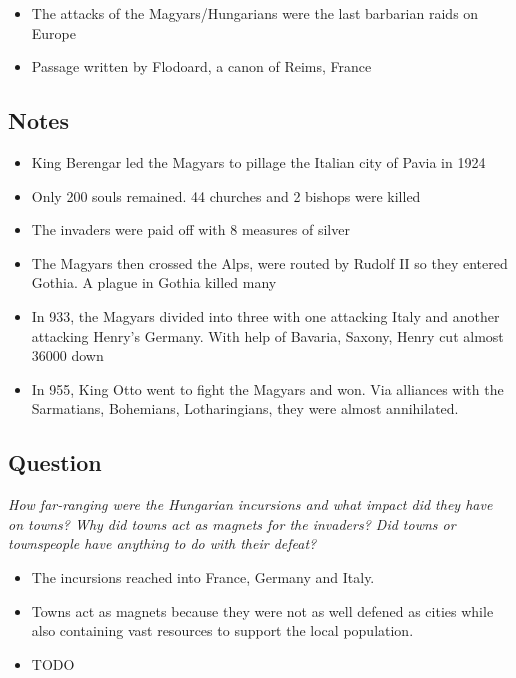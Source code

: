 \documentclass[12pt]{article}
\begin{document}
\begin{itemize}
	\item The attacks of the Magyars/Hungarians were the last barbarian raids on Europe
	\item Passage written by Flodoard, a canon of Reims, France
\end{itemize}

\subsection*{Notes}

\begin{itemize}
	\item King Berengar led the Magyars to pillage the Italian city of Pavia in 1924
	\item Only 200 souls remained. 44 churches and 2 bishops were killed
	\item The invaders were paid off with 8 measures of silver
	\item The Magyars then crossed the Alps, were routed by Rudolf II so they entered Gothia. A plague in Gothia killed many
	\item In 933, the Magyars divided into three with one attacking Italy and another attacking Henry's Germany. With help of Bavaria, Saxony, Henry cut almost 36000 down
	\item In 955, King Otto went to fight the Magyars and won. Via alliances with the Sarmatians, Bohemians, Lotharingians, they were almost annihilated.
\end{itemize}

\subsection*{Question}

\textit{How far-ranging were the Hungarian incursions and what impact did they have on towns? Why did towns act as magnets for the invaders? Did towns or townspeople have anything to do with their defeat?}

\begin{itemize}
	\item The incursions reached into France, Germany and Italy.
	\item Towns act as magnets because they were not as well defened as cities while also containing vast resources to support the local population.
	\item TODO

\end{itemize}
\end{document}
